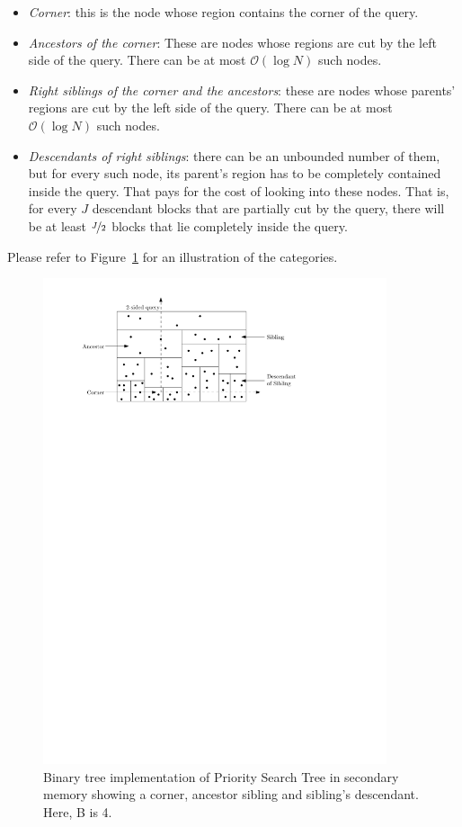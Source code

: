 \documentclass[twoside,11pt,openright]{report}
\begin{document}
\begin{itemize}
	\item \textit{Corner}: this is the node whose region contains the corner of the query.
	\item \textit{Ancestors of the corner}: These are nodes whose regions are cut by the left side of the query. There can be at most $\mathcal{O}(\log N)$ such nodes.
	\item \textit{Right siblings of the corner and the ancestors}: these are nodes whose parents' regions are cut by the left side of the query. There can be at most $ \mathcal{O}(\log N)$ such nodes.
	\item \textit{Descendants of right siblings}: there can be an unbounded number of them, but for every such node, its parent's region has to be completely contained inside the query. That pays for the cost of looking into these nodes. That is, for every $J$ descendant blocks that are partially cut by the query, there will be at least $\nicefrac{J}{2}$ blocks that lie completely inside the query. 

\end{itemize} 

Please refer to Figure~\ref{fig:ramaswamy_query} for an illustration of the categories.

\begin{figure}[h]
	\centering
		\includegraphics[width=0.9\textwidth]{../figures/ramaswamy_query}
	\caption{Binary tree implementation of Priority Search Tree in secondary memory showing a corner, ancestor sibling and sibling's descendant. Here, B is 4.}
	\label{fig:ramaswamy_query}
\end{figure}
\end{document}

